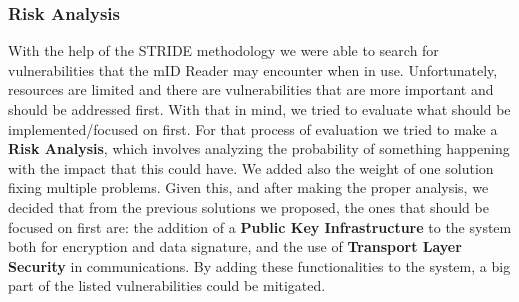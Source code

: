 \subsubsection{Risk Analysis}

With the help of the STRIDE methodology we were able to search for vulnerabilities that the mID Reader may encounter when in use. Unfortunately, resources are limited and there are vulnerabilities that are more important and should be addressed first. With that in mind, we tried to evaluate what should be implemented/focused on first. For that process of evaluation we tried to make a \textbf{Risk Analysis}, which involves analyzing the probability of something happening with the impact that this could have. We added also the weight of one solution fixing multiple problems.
Given this, and after making the proper analysis, we decided that from the previous solutions we proposed, the ones that should be focused on first are: the addition of a \textbf{Public Key Infrastructure} to the system both for encryption and data signature, and the use of \textbf{Transport Layer Security} in communications. By adding these functionalities to the system, a big part of the listed vulnerabilities could be mitigated.